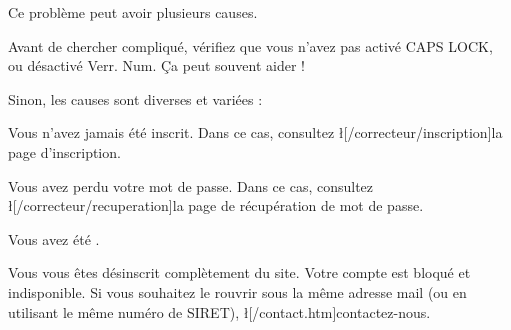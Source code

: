 Ce problème peut avoir plusieurs causes.

Avant de chercher compliqué, vérifiez que vous n'avez pas activé CAPS LOCK, ou désactivé Verr. Num. Ça peut souvent aider !

Sinon, les causes sont diverses et variées :
\item Vous n'avez jamais été inscrit. Dans ce cas, consultez \l[/correcteur/inscription]{la page d'inscription}.
\item Vous avez perdu votre mot de passe. Dans ce cas, consultez \l[/correcteur/recuperation]{la page de récupération de mot de passe}.
\item Vous avez été .
\item Vous vous êtes désinscrit complètement du site. Votre compte est bloqué et indisponible. Si vous souhaitez le rouvrir sous la même adresse mail (ou en utilisant le même numéro de SIRET), \l[/contact.htm]{contactez-nous}.

